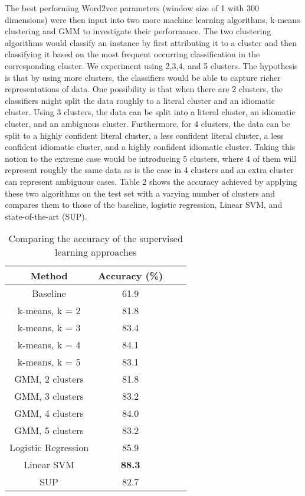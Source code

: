 \documentclass[11pt]{article}
\begin{document}
The best performing Word2vec parameters (window size of 1 with 300 dimensions) were then input into two more machine learning algorithms, k-means clustering and GMM to investigate their performance. The two clustering algorithms would classify an instance by first attributing it to a cluster and then classifying it based on the most frequent occurring classification in the corresponding cluster. We experiment using 2,3,4, and 5 clusters. The hypothesis is that by using more clusters, the classifiers would be able to capture richer representations of data. One possibility is that when there are 2 clusters, the classifiers might split the data roughly to a literal cluster and an idiomatic cluster. Using 3 clusters, the data can be split into a literal cluster, an idiomatic cluster, and an ambiguous cluster. Furthermore, for 4 clusters, the data can be split to a highly confident literal cluster, a less confident literal cluster, a less confident idiomatic cluster, and a highly confident idiomatic cluster. Taking this notion to the extreme case would be introducing 5 clusters, where 4 of them will represent roughly the same data as is the case in 4 clusters and an extra cluster can represent ambiguous cases. Table 2 shows the accuracy achieved by applying these two algorithms on the test set with a varying number of clusters and compares them to those of the baseline, logistic regression, Linear SVM, and state-of-the-art (SUP).

\begin{table}
\centering
\begin{tabular}{|c|c|c|c|} \hline
Method & Accuracy (\%) \\ \hline
Baseline & 61.9 \\ \hline
k-means, k = 2 & 81.8 \\ \hline
k-means, k = 3 & 83.4 \\ \hline
k-means, k = 4 & 84.1 \\ \hline
k-means, k = 5 & 83.1 \\ \hline
GMM, 2 clusters & 81.8  \\ \hline
GMM, 3 clusters & 83.2  \\ \hline
GMM, 4 clusters & 84.0  \\ \hline
GMM, 5 clusters & 83.2  \\ \hline
Logistic Regression & 85.9 \\ \hline
Linear SVM & \textbf{88.3} \\ \hline
SUP & 82.7 \\ \hline
\end{tabular}
\caption{Comparing the accuracy of the supervised learning approaches}
\end{table}
\end{document}
